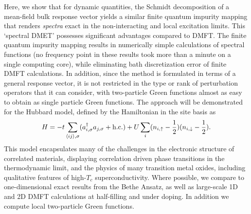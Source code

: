 \documentclass[aps,twocolumn,nobibnotes]{revtex4}
\begin{document}
Here, we show that for dynamic quantities, the Schmidt decomposition of a mean-field bulk response vector yields a similar finite quantum impurity mapping
that renders {\em spectra} exact in the non-interacting and local excitation limits. This `spectral DMET' possesses significant advantages compared to
DMFT. The finite quantum impurity mapping results in numerically simple calculations of spectral functions (no frequency point in these results
took more than a minute on a single computing core), while eliminating bath discretization error of finite DMFT calculations.
In addition, since the method is formulated in terms of a general response vector, it is not restricted in the type or rank of perturbation 
operators that it can consider, with two-particle Green functions almost as easy to obtain as single particle Green functions. 
The approach will be demonstrated for the Hubbard model, 
defined by the Hamiltonian in the site basis as
\begin{equation}
H = -t \sum_{\langle ij \rangle, \sigma} (a_{i,\sigma}^{\dagger}a_{j,\sigma} + \text{\textnormal {h.c.}}) + U \sum_i (n_{i,\uparrow} - \frac{1}{2})(n_{i,\downarrow} - \frac{1}{2})  . \label{eqn:hub}
\end{equation}
This model encapsulates many of the challenges in the electronic structure of correlated materials, displaying correlation driven 
phase transitions in the thermodynamic limit, and the physics of many transition metal oxides\cite{Limelette2003}, including qualitative features 
of high-$T_c$ superconductivity\cite{Anderson87,Sordi2012,Millis2013}. Where possible, we compare to one-dimensional exact results from the Bethe 
Ansatz\cite{Lieb68,Ovchinni1970}, as well as large-scale 1D and 2D DMFT calculations at half-filling and under doping\cite{Go2009,Kotliar2008,Masatoshi2009}. 
In addition we compute local two-particle Green functions.
\end{document}
